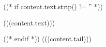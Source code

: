 ((* if content.text.strip() != '' *))
\begin{casestudy}{}
(((content.text)))
\end{casestudy}
((* endif *))
(((content.tail)))

